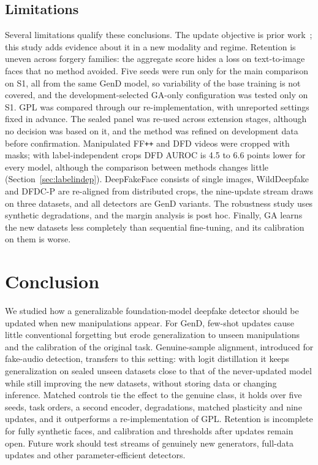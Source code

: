 \documentclass[journal]{IEEEtran}
\newcommand{\ffpp}{FF\texttt{++}}
\begin{document}
\subsection{Limitations}
Several limitations qualify these conclusions. The update objective is prior work~\cite{ma2021dfwf}; this study adds evidence about it in a new modality and regime. Retention is uneven across forgery families: the aggregate score hides a loss on text-to-image faces that no method avoided. Five seeds were run only for the main comparison on S1, all from the same GenD model, so variability of the base training is not covered, and the development-selected GA-only configuration was tested only on S1. GPL was compared through our re-implementation, with unreported settings fixed in advance. The sealed panel was re-used across extension stages, although no decision was based on it, and the method was refined on development data before confirmation. Manipulated \ffpp{} and DFD videos were cropped with masks; with label-independent crops DFD AUROC is 4.5 to 6.6 points lower for every model, although the comparison between methods changes little (Section~\ref{sec:labelindep}). DeepFakeFace consists of single images, WildDeepfake and DFDC-P are re-aligned from distributed crops, the nine-update stream draws on three datasets, and all detectors are GenD variants. The robustness study uses synthetic degradations, and the margin analysis is post hoc. Finally, GA learns the new datasets less completely than sequential fine-tuning, and its calibration on them is worse.

\section{Conclusion}

We studied how a generalizable foundation-model deepfake detector should be updated when new manipulations appear. For GenD, few-shot updates cause little conventional forgetting but erode generalization to unseen manipulations and the calibration of the original task. Genuine-sample alignment, introduced for fake-audio detection, transfers to this setting: with logit distillation it keeps generalization on sealed unseen datasets close to that of the never-updated model while still improving the new datasets, without storing data or changing inference. Matched controls tie the effect to the genuine class, it holds over five seeds, task orders, a second encoder, degradations, matched plasticity and nine updates, and it outperforms a re-implementation of GPL. Retention is incomplete for fully synthetic faces, and calibration and thresholds after updates remain open. Future work should test streams of genuinely new generators, full-data updates and other parameter-efficient detectors.

\balance


\end{document}
